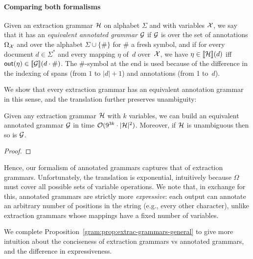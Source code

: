 
  


\paragraph{Comparing both formalisms}
Given an extraction grammar $\mathcal{H}$ on alphabet $\Sigma$ and with variables
$\mathcal{X}$, we say that it 
has an \emph{equivalent annotated grammar} $\mathcal{G}$ if $\mathcal{G}$ is over the 
set of annotations $\Omega_{\mathcal{X}}$ and over the
alphabet $\Sigma \cup \{\#\}$
for $\#$ a fresh symbol, and
if for every document $d \in \Sigma^*$ and every mapping $\eta$ of~$d$ over~$\mathcal{X}$, we have
$\eta \in {\llbracket{\mathcal{H}}\rrbracket}(d)$ iff $\textsf{out}(\eta) \in {\llbracket{\mathcal{G}}\rrbracket}(d\cdot \#)$.
%
The $\#$-symbol at the end is used because of the difference in the indexing of spans (from $1$ to $|d|+1$) and annotations (from 1 to~$d$).
%

We show that every extraction grammar has an equivalent annotation grammar
in this sense, and the translation further preserves unambiguity:

%

\begin{proposition}\label{gram:prop:extrac-grammars-general}
  Given any extraction grammar $\mathcal{H}$ with $k$ variables, we can build an
  equivalent annotated grammar $\mathcal{G}$ in time $\mathcal{O}(9^{3k}\cdot|\mathcal{H}|^2)$. Moreover, if $\mathcal{H}$ is unambiguous then so is $\mathcal{G}$.
\end{proposition}
\begin{proof}
  
\end{proof}

Hence, our formalism of annotated grammars captures that of extraction grammars.
%
Unfortunately, the translation is exponential, 
intuitively because $\Omega$ must cover all possible sets of variable operations.
We note that, in exchange for this, annotated grammars
are strictly more \emph{expressive}: each output can annotate an arbitrary
number of positions in the string (e.g., every other character), unlike
extraction grammars whose mappings have a fixed number of variables.

We complete Proposition~\ref{gram:prop:extrac-grammars-general} to give more
intuition about the conciseness of extraction grammars vs annotated grammars,
and the difference in expressiveness.

